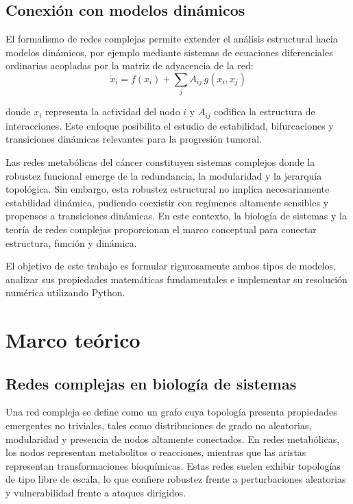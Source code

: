\documentclass[12pt,spanish]{article}
\begin{document}
	\subsection{Conexión con modelos dinámicos}
	
	El formalismo de redes complejas permite extender el análisis estructural hacia modelos dinámicos, por ejemplo mediante sistemas de ecuaciones diferenciales ordinarias acopladas por la matriz de adyacencia de la red: 
	\begin{equation}
		\dot{x}_i = f(x_i) + \sum_{j} A_{ij}\, g(x_i, x_j)
	\end{equation}
	
	
	donde $x_i$ representa la actividad del nodo $i$ y $A_{ij}$ codifica la estructura de interacciones. Este enfoque posibilita el estudio de estabilidad, bifurcaciones y transiciones dinámicas relevantes para la progresión tumoral.
	
	Las redes metabólicas del cáncer constituyen sistemas complejos donde la robustez funcional emerge de la redundancia, la modularidad y la jerarquía topológica. Sin embargo, esta robustez estructural no implica necesariamente estabilidad dinámica, pudiendo coexistir con regímenes altamente sensibles y propensos a transiciones dinámicas. En este contexto, la biología de sistemas y la teoría de redes complejas proporcionan el marco conceptual para conectar estructura, función y dinámica.
	
	El objetivo de este trabajo es formular rigurosamente ambos tipos de modelos, analizar sus propiedades matemáticas fundamentales e implementar su resolución numérica utilizando Python.
	
	\section{Marco teórico}
	
	\subsection{Redes complejas en biología de sistemas}
	
	Una red compleja se define como un grafo cuya topología presenta propiedades emergentes no triviales, tales como distribuciones de grado no aleatorias, modularidad y presencia de nodos altamente conectados. En redes metabólicas, los nodos representan metabolitos o reacciones, mientras que las aristas representan transformaciones bioquímicas. Estas redes suelen exhibir topologías de tipo libre de escala, lo que confiere robustez frente a perturbaciones aleatorias y vulnerabilidad frente a ataques dirigidos.
	
\end{document}
